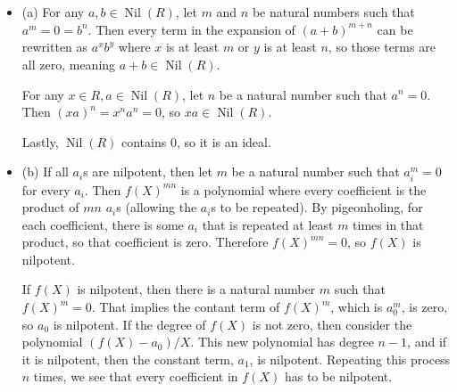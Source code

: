 \documentclass[12pt]{article}
\begin{document}
\section{}
\noindent{}\bigskip
\par
\begin{itemize}
    \item (a) For any $a, b \in \operatorname{Nil}(R)$, let $m$ and $n$ be natural numbers such that $a^m=0=b^n$. Then every term in the expansion of $(a+b)^{m+n}$ can be rewritten as $a^xb^y$ where $x$ is at least $m$ or $y$ is at least $n$, so those terms are all zero, meaning $a+b\in \operatorname{Nil}(R)$.
        \par
        For any $x \in R, a \in \operatorname{Nil}(R)$, let $n$ be a natural number such that $a^n=0$. Then $(xa)^n=x^na^n=0$, so $xa \in \operatorname{Nil}(R)$.
        \par
        Lastly, $\operatorname{Nil}(R)$ contains 0, so it is an ideal.
    \item (b) If all $a_i$s are nilpotent, then let $m$ be a natural number such that $a_i^m=0$ for every $a_i$. Then $f(X)^{mn}$ is a polynomial where every coefficient is the product of $mn$ $a_i$s (allowing the $a_i$s to be repeated). By pigeonholing, for each coefficient, there is some $a_i$ that is repeated at least $m$ times in that product, so that coefficient is zero. Therefore $f(X)^{mn}=0$, so $f(X)$ is nilpotent.
        \par
        If $f(X)$ is nilpotent, then there is a natural number $m$ such that $f(X)^m=0$. That implies the contant term of $f(X)^m$, which is $a_0^m$, is zero, so $a_0$ is nilpotent. If the degree of $f(X)$ is not zero, then consider the polynomial $(f(X)-a_0)/X$. This new polynomial has degree $n-1$, and if it is nilpotent, then the constant term, $a_1$, is nilpotent. Repeating this process $n$ times, we see that every coefficient in $f(X)$ has to be nilpotent.
\end{itemize}
\end{document}
